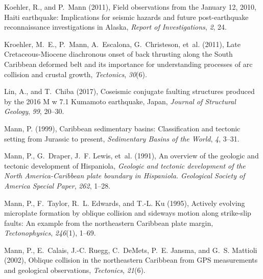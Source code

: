 \documentclass[linenumbers,draft]{agujournal}
\begin{document}
\begin{thebibliography}{65}
Koehler, R., and P.~Mann (2011), {Field observations from the January 12, 2010,
  Haiti earthquake: Implications for seismic hazards and future post-earthquake
  reconnaissance investigations in Alaska}, \textit{Report of Investigations},
  \textit{2}, 24.

Kroehler, M.~E., P.~Mann, A.~Escalona, G.~Christeson, et~al. (2011), {Late
  Cretaceous-Miocene diachronous onset of back thrusting along the South
  Caribbean deformed belt and its importance for understanding processes of arc
  collision and crustal growth}, \textit{Tectonics}, \textit{30}(6).

Lin, A., and T.~Chiba (2017), {Coseismic conjugate faulting structures produced
  by the 2016 M w 7.1 Kumamoto earthquake, Japan}, \textit{Journal of
  Structural Geology}, \textit{99}, 20--30.

Mann, P. (1999), {Caribbean sedimentary basins: Classification and tectonic
  setting from Jurassic to present}, \textit{Sedimentary Basins of the World},
  \textit{4}, 3--31.

Mann, P., G.~Draper, J.~F. Lewis, et~al. (1991), {An overview of the geologic
  and tectonic development of Hispaniola}, \textit{Geologic and tectonic
  development of the North America-Caribbean plate boundary in Hispaniola.
  Geological Society of America Special Paper}, \textit{262}, 1--28.

Mann, P., F.~Taylor, R.~L. Edwards, and T.-L. Ku (1995), Actively evolving
  microplate formation by oblique collision and sideways motion along
  strike-slip faults: {An} example from the northeastern {Caribbean} plate
  margin, \textit{Tectonophysics}, \textit{246}(1), 1--69.

Mann, P., E.~Calais, J.-C. Ruegg, C.~DeMets, P.~E. Jansma, and G.~S. Mattioli
  (2002), Oblique collision in the northeastern {Caribbean from GPS}
  measurements and geological observations, \textit{Tectonics}, \textit{21}(6).


\end{thebibliography}
\end{document}
